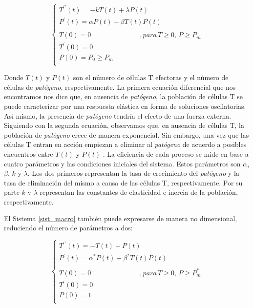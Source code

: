 \begin{equation}
	\label{sist_macro}
	\left\{ \begin{array}{l}
	{T^{\prime\prime}}(t) = -kT(t) + \lambda P(t) \\
	{P^{\prime}}(t) = \alpha P(t) - \beta T(t)P(t) \\
	\\
	T(0)=0 \hspace{3cm} ,para\, T \geq 0,\, P \geq P_m \\
	T^{\prime}(0)=0  \\
	P(0)=P_0 \geq P_m  \\ 
	\end{array}
	\right.
\end{equation}

Donde $T(t)$ y $P(t)$ son el número de células T efectoras y el número de células de \textit{patógeno}, respectivamente. La primera ecuación diferencial que nos encontramos nos dice que, en ausencia de \textit{patógeno}, la población de células T se puede caracterizar por una respuesta elástica en forma de soluciones oscilatorias. Así mismo, la presencia de \textit{patógeno} tendría el efecto de una fuerza externa. Siguiendo con la segunda ecuación, observamos que, en ausencia de células T, la población de \textit{patógeno} crece de manera exponencial. Sin embargo, una vez que las células T entran en acción empiezan a eliminar al \textit{patógeno} de acuerdo a posibles encuentros entre $T(t)$ y $P(t)$ \citep{arias2016emergent}. La eficiencia de cada proceso se mide en base a cuatro parámetros y las condiciones iniciales del sistema. Estos parámetros son $\alpha$, $\beta$, $k$ y $\lambda$. Los dos primeros representan la tasa de crecimiento del \textit{patógeno} y la tasa de eliminación del mismo a causa de las células T, respectivamente. Por su parte $k$ y $\lambda$ representan las constantes de elasticidad e inercia de la población, respectivamente.

El Sistema \ref{sist_macro} también puede expresarse de manera no dimensional, reduciendo el número de parámetros a dos: 

\begin{equation}
	\label{sist_macro_nod}
	\left\{ \begin{array}{l}
	{T^{\prime\prime}}(t) = -T(t) + P(t) \\
	{P^{\prime}}(t) = \alpha^{*} P(t) - \beta^{*} T(t)P(t) \\
	\\
	T(0)=0 \hspace{3cm} ,para\, T \geq 0,\, P \geq P_m^{*} \\
	T^{\prime}(0)=0  \\
	P(0)=1 \\ 
	\end{array}
	\right.
\end{equation}

